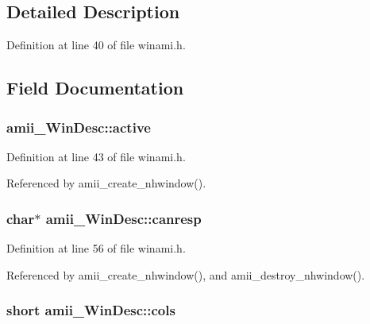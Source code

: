 \subsection{Detailed Description}


Definition at line 40 of file winami.\+h.



\subsection{Field Documentation}
\hypertarget{structamii__WinDesc_a0977c321f7baae08763a4f998c2e2c3b}{
\subsubsection[{active}]{ amii\+\_\+\+Win\+Desc\+::active}}\label{structamii__WinDesc_a0977c321f7baae08763a4f998c2e2c3b}


Definition at line 43 of file winami.\+h.



Referenced by amii\+\_\+create\+\_\+nhwindow().

\hypertarget{structamii__WinDesc_ac8c4b6085649b349a4d36d38d3c4344d}{
\subsubsection[{canresp}]{\setlength{\rightskip}{0pt plus 5cm}char$\ast$ amii\+\_\+\+Win\+Desc\+::canresp}}\label{structamii__WinDesc_ac8c4b6085649b349a4d36d38d3c4344d}


Definition at line 56 of file winami.\+h.



Referenced by amii\+\_\+create\+\_\+nhwindow(), and amii\+\_\+destroy\+\_\+nhwindow().

\hypertarget{structamii__WinDesc_a8ef9da0197015f48920307f3692f2a54}{
\subsubsection[{cols}]{\setlength{\rightskip}{0pt plus 5cm}short amii\+\_\+\+Win\+Desc\+::cols}}\label{structamii__WinDesc_a8ef9da0197015f48920307f3692f2a54}


